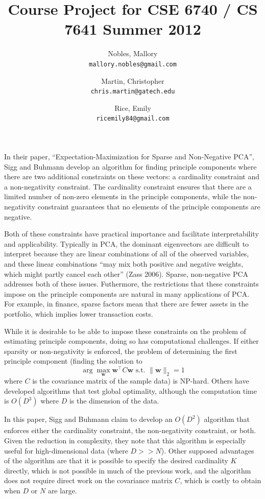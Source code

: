\documentclass{article}
\title{Course Project for CSE 6740 / CS 7641 Summer 2012}
\author{Nobles, Mallory \\ \texttt{mallory.nobles@gmail.com}
  \and Martin, Christopher \\ \texttt{chris.martin@gatech.edu}
  \and Rice, Emily \\ \texttt{ricemily84@gmail.com} }
\date{}
\begin{document}
\maketitle

In their paper, ``Expectation-Maximization for Sparse and Non-Negative PCA'',
Sigg and Buhmann develop an algorithm for finding principle components where
there are two additional constraints on these vectors:
a cardinality constraint and a non-negativity constraint.
The cardinality constraint ensures that there are a limited number
of non-zero elements in the principle components, while
the non-negativity constraint guarantees that no elements of
the principle components are negative.

Both of these constraints have practical importance and facilitate
interpretability and applicability.
Typically in PCA, the dominant eigenvectors are difficult to interpret
because they are linear combinations of all of the observed variables,
and these linear combinations ``may mix both positive and negative weights,
which might partly cancel each other'' (Zass 2006).
Sparse, non-negative PCA addresses both of these issues.
Futhermore, the restrictions that these constraints impose on the
principle components are natural in many applications of PCA.
For example, in finance, sparse factors mean that there are
fewer assets in the portfolio, which implies lower transaction costs.

While it is desirable to be able to impose these constraints on
the problem of estimating principle components, doing so has
computational challenges. If either sparsity or non-negativity
is enforced, the problem of determining the first principle component
(finding the solution to \[
\arg\max_{\mathbf{w}} \mathbf{w}^\intercal C\mathbf{w}
\textrm{ s.t. } \|\mathbf{w}\|_2 = 1
\]
where $C$ is the covariance matrix of the sample data) is NP-hard.
Others have developed algorithms that test global optimality, although
the computation time is $O(D^3)$ where $D$ is the dimension of the data.

In this paper, Sigg and Buhmann claim to develop an $O(D^2)$ algorithm
that enforces either the cardinality constraint,
the non-negativity constraint, or both.
Given the reduction in complexity, they note that this algorithm is
especially useful for high-dimensional data (where $D >> N$).
Other supposed advantages of the algorithm are that it is possible
to specify the desired cardinality $K$ directly, which is not possible
in much of the previous work, and the algorithm does not require
direct work on the covariance matrix $C$, which is costly to obtain
when $D$ or $N$ are large.
\end{document}
